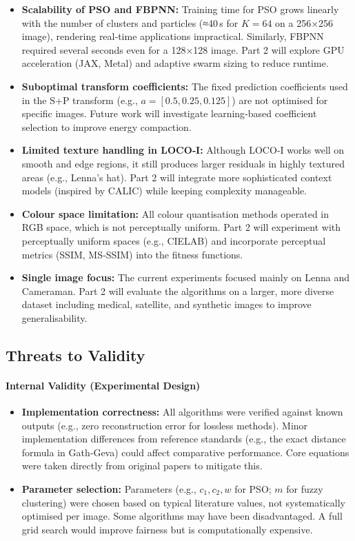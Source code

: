 \begin{itemize}
    \item \textbf{Scalability of PSO and FBPNN:} Training time for PSO grows linearly with the number of clusters and particles (≈40 s for \(K=64\) on a 256×256 image), rendering real‑time applications impractical. Similarly, FBPNN required several seconds even for a 128×128 image. Part 2 will explore GPU acceleration (JAX, Metal) and adaptive swarm sizing to reduce runtime.
    \item \textbf{Suboptimal transform coefficients:} The fixed prediction coefficients used in the S+P transform (e.g., \(a=[0.5,0.25,0.125]\)) are not optimised for specific images. Future work will investigate learning‑based coefficient selection to improve energy compaction.
    \item \textbf{Limited texture handling in LOCO‑I:} Although LOCO‑I works well on smooth and edge regions, it still produces larger residuals in highly textured areas (e.g., Lenna’s hat). Part 2 will integrate more sophisticated context models (inspired by CALIC) while keeping complexity manageable.
    \item \textbf{Colour space limitation:} All colour quantisation methods operated in RGB space, which is not perceptually uniform. Part 2 will experiment with perceptually uniform spaces (e.g., CIELAB) and incorporate perceptual metrics (SSIM, MS‑SSIM) into the fitness functions.
    \item \textbf{Single image focus:} The current experiments focused mainly on Lenna and Cameraman. Part 2 will evaluate the algorithms on a larger, more diverse dataset including medical, satellite, and synthetic images to improve generalisability.
\end{itemize}

\subsection{Threats to Validity}

\paragraph{Internal Validity (Experimental Design)}
\begin{itemize}
    \item \textbf{Implementation correctness:} All algorithms were verified against known outputs (e.g., zero reconstruction error for lossless methods). Minor implementation differences from reference standards (e.g., the exact distance formula in Gath‑Geva) could affect comparative performance. Core equations were taken directly from original papers to mitigate this.
    \item \textbf{Parameter selection:} Parameters (e.g., \(c_1, c_2, w\) for PSO; \(m\) for fuzzy clustering) were chosen based on typical literature values, not systematically optimised per image. Some algorithms may have been disadvantaged. A full grid search would improve fairness but is computationally expensive.
\end{itemize}


